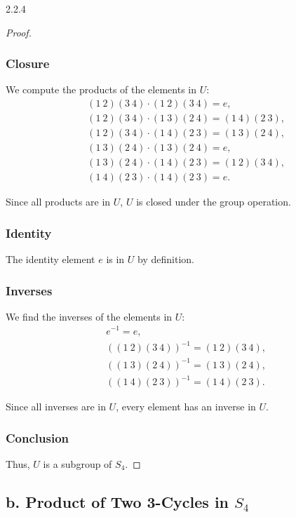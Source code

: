 \documentclass[12pt]{amsart}
\theoremstyle{definition}
\numberwithin{equation}{section}
\begin{document}
\begin{exercise}{2.2.4}
\begin{proof}
    \subsubsection*{Closure}
    We compute the products of the elements in \(U\):
    \[
    \begin{aligned}
    &(1 \ 2)(3 \ 4) \cdot (1 \ 2)(3 \ 4) = e, \\
    &(1 \ 2)(3 \ 4) \cdot (1 \ 3)(2 \ 4) = (1 \ 4)(2 \ 3), \\
    &(1 \ 2)(3 \ 4) \cdot (1 \ 4)(2 \ 3) = (1 \ 3)(2 \ 4), \\
    &(1 \ 3)(2 \ 4) \cdot (1 \ 3)(2 \ 4) = e, \\
    &(1 \ 3)(2 \ 4) \cdot (1 \ 4)(2 \ 3) = (1 \ 2)(3 \ 4), \\
    &(1 \ 4)(2 \ 3) \cdot (1 \ 4)(2 \ 3) = e.
    \end{aligned}
    \]
    
    Since all products are in \(U\), \(U\) is closed under the group operation.
    
    \subsubsection*{Identity}
    The identity element \(e\) is in \(U\) by definition.
    
    \subsubsection*{Inverses}
    We find the inverses of the elements in \(U\):
    \[
    \begin{aligned}
    &e^{-1} = e, \\
    &((1 \ 2)(3 \ 4))^{-1} = (1 \ 2)(3 \ 4), \\
    &((1 \ 3)(2 \ 4))^{-1} = (1 \ 3)(2 \ 4), \\
    &((1 \ 4)(2 \ 3))^{-1} = (1 \ 4)(2 \ 3).
    \end{aligned}
    \]
    
    Since all inverses are in \(U\), every element has an inverse in \(U\).
    
    \subsubsection*{Conclusion}
    Thus, \(U\) is a subgroup of \(S_4\).
    
    \end{proof}
    
    \subsection*{\textbf{b. Product of Two 3-Cycles in \(S_4\)}}
    

\end{exercise}
\end{document}
